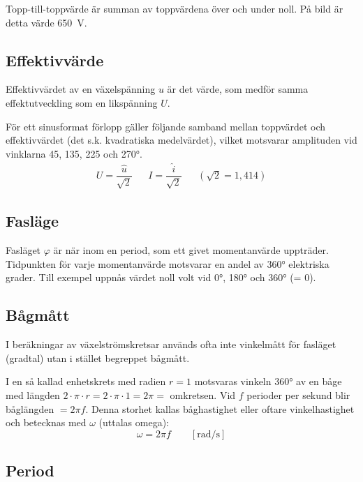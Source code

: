 Topp-till-toppvärde är summan av toppvärdena över och under noll.
På bild  är detta värde \SI{650}{\volt}.

\subsection{Effektivvärde}
\label{effektivvärde}

Effektivvärdet av en växelspänning \(u\) är det värde, som medför samma
effektutveckling som en likspänning \(U\).

För ett sinusformat förlopp gäller följande samband mellan toppvärdet och
effektivvärdet (det s.k. kvadratiska medelvärdet), vilket motsvarar amplituden
vid vinklarna 45, 135, 225 och \ang{270}.
\[
\begin{array}{lllll}
U=\dfrac{\hat{u}}{\sqrt{2}} & & I=\dfrac{\hat{i}}{\sqrt{2}} & & (\sqrt{2} = 1,414)
\end{array}
\]
\subsection{Fasläge}

Fasläget \(\varphi\) är när inom en period, som ett givet momentanvärde
uppträder.
Tidpunkten för varje momentanvärde motsvarar en andel av \ang{360} elektriska
grader.
Till exempel uppnås värdet noll volt vid \ang{0}, \ang{180} och \ang{360} (= 0\degree).

\subsection{Bågmått}

I beräkningar av växelströmskretsar används ofta inte vinkelmått för fasläget
(gradtal) utan i stället begreppet bågmått.

I en så kallad enhetskrets med radien \(r = 1\) motsvaras vinkeln \ang{360} av
en båge med längden \(2 \cdot \pi \cdot r= 2 \cdot \pi \cdot 1 = 2 \pi =\)
omkretsen.
Vid \(f\) perioder per sekund blir båglängden \(= 2\pi f\).
Denna storhet kallas båghastighet eller oftare vinkelhastighet och betecknas
med \(\omega\) (uttalas omega):
\[\omega= 2\pi f\qquad [\text{rad/s}]\]
\subsection{Period}
\label{period}

